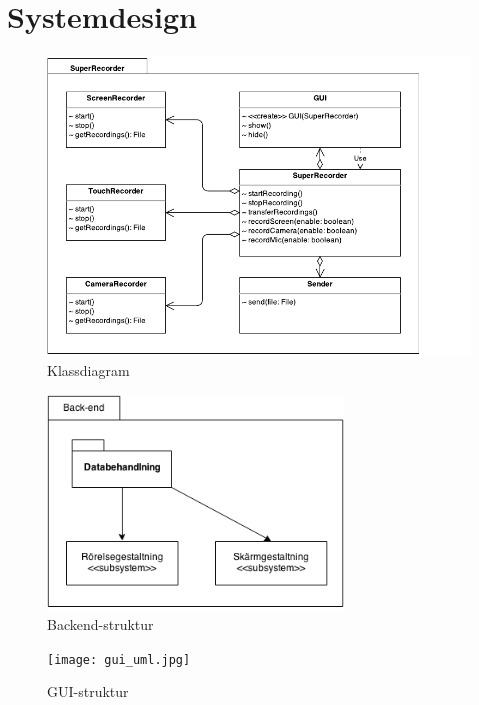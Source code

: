 \section{Systemdesign}
\label{sec:system_design}

\begin{figure}[H]
  \includegraphics[width=1.0\textwidth]{CrudeClassDiagram.pdf}
\caption{Klassdiagram}
\end{figure}
\begin{figure}[H]
\includegraphics[width=0.7\textwidth]{backendorganizational.png}
\caption{Backend-struktur}
\end{figure}
\begin{figure}[H]
\texttt{[image: gui\_uml.jpg]}
\caption{GUI-struktur}
\end{figure}




